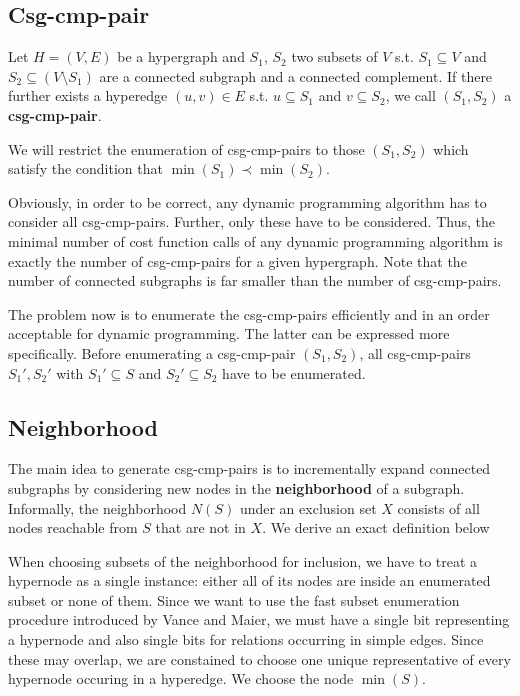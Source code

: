 \documentclass[11pt]{article}
\begin{document}
\subsection{Csg-cmp-pair}
\label{sec:orgeeff945}
\begin{definition}
Let \(H=(V,E)\) be a hypergraph and \(S_1\), \(S_2\) two subsets of \(V\) s.t. \(S_1\subseteq V\) and
\(S_2\subseteq(V\setminus S_1)\) are a connected subgraph and a connected complement. If there further
exists a hyperedge \((u,v)\in E\) s.t. \(u\subseteq S_1\) and \(v\subseteq S_2\), we call
\((S_1,S_2)\) a \textbf{csg-cmp-pair}.
\end{definition}

We will restrict the enumeration of csg-cmp-pairs to those \((S_1,S_2)\) which satisfy the condition
that \(\min(S_1)\prec\min(S_2)\).

Obviously, in order to be correct, any dynamic programming algorithm has to consider all
csg-cmp-pairs. Further, only these have to be considered. Thus, the minimal number of cost function
calls of any dynamic programming algorithm is exactly the number of csg-cmp-pairs for a given
hypergraph. Note that the number of connected subgraphs is far smaller than the number of
csg-cmp-pairs.

The problem now is to enumerate the csg-cmp-pairs efficiently and in an order
acceptable for dynamic programming. The latter can be expressed more specifically. Before enumerating
a csg-cmp-pair \((S_1,S_2)\), all csg-cmp-pairs \(S_1',S_2'\) with \(S_1'\subseteq S\) and
\(S_2'\subseteq S_2\) have to be enumerated.
\subsection{Neighborhood}
\label{sec:org95aaf8b}
The main idea to generate csg-cmp-pairs is to incrementally expand connected subgraphs by considering
new nodes in the \textbf{neighborhood} of a subgraph. Informally, the neighborhood \(N(S)\) under an exclusion
set \(X\) consists of all nodes reachable from \(S\) that are not in \(X\). We derive an exact
definition below

When choosing subsets of the neighborhood for inclusion, we have to treat a hypernode as a single
instance: either all of its nodes are inside an enumerated subset or none of them. Since we want to
use the fast subset enumeration procedure introduced by Vance and Maier, we must have a single bit
representing a hypernode and also single bits for relations occurring in simple edges. Since these may
overlap, we are constained to choose one unique representative of every hypernode occuring in a
hyperedge. We choose the node \(\min(S)\).
\end{document}
